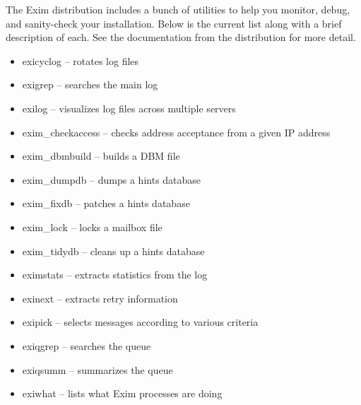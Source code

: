\protect\hypertarget{part0026_split_043.htmlux5cux23_idIndexMarker2623}{}{}The
Exim distribution includes a bunch of utilities to help you monitor,
debug, and sanity-check your installation. Below is the current list
along with a brief description of each. See the documentation from the
distribution for more detail.

\begin{itemize}
\item
  \protect\hypertarget{part0026_split_043.htmlux5cux23_idIndexMarker2624}{}{}{exicyclog}
  -- rotates log files
\item
  \protect\hypertarget{part0026_split_043.htmlux5cux23_idIndexMarker2625}{}{}{exigrep}
  -- searches the main log
\item
  \protect\hypertarget{part0026_split_043.htmlux5cux23_idIndexMarker2626}{}{}{exilog}
  -- visualizes log files across multiple servers
\item
  \protect\hypertarget{part0026_split_043.htmlux5cux23_idIndexMarker2627}{}{}{exim\_checkaccess}
  -- checks address acceptance from a given IP address
\item
  \protect\hypertarget{part0026_split_043.htmlux5cux23_idIndexMarker2628}{}{}{exim\_dbmbuild}
  -- builds a DBM file
\item
  \protect\hypertarget{part0026_split_043.htmlux5cux23_idIndexMarker2629}{}{}{exim\_dumpdb}
  -- dumps a hints database
\item
  \protect\hypertarget{part0026_split_043.htmlux5cux23_idIndexMarker2630}{}{}{exim\_fixdb}
  -- patches a hints database
\item
  \protect\hypertarget{part0026_split_043.htmlux5cux23_idIndexMarker2631}{}{}{exim\_lock}
  -- locks a mailbox file
\item
  \protect\hypertarget{part0026_split_043.htmlux5cux23_idIndexMarker2632}{}{}{exim\_tidydb}
  -- cleans up a hints database
\item
  \protect\hypertarget{part0026_split_043.htmlux5cux23_idIndexMarker2633}{}{}{eximstats}
  -- extracts statistics from the log
\item
  \protect\hypertarget{part0026_split_043.htmlux5cux23_idIndexMarker2634}{}{}{exinext}
  -- extracts retry information
\item
  \protect\hypertarget{part0026_split_043.htmlux5cux23_idIndexMarker2635}{}{}{exipick}
  -- selects messages according to various criteria
\item
  \protect\hypertarget{part0026_split_043.htmlux5cux23_idIndexMarker2636}{}{}{exiqgrep}
  -- searches the queue
\item
  \protect\hypertarget{part0026_split_043.htmlux5cux23_idIndexMarker2637}{}{}{exiqsumm}
  -- summarizes the queue
\item
  \protect\hypertarget{part0026_split_043.htmlux5cux23_idIndexMarker2638}{}{}{exiwhat}
  -- lists what Exim processes are doing
\end{itemize}


